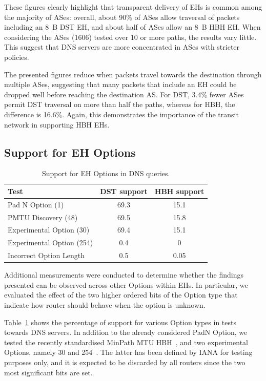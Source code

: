 \documentclass[conference]{IEEEtran}
\begin{document}
These figures clearly highlight that transparent delivery of EHs is common
among the majority of ASes: overall, about 90\% of ASes allow
traversal of packets including an 8~B DST EH, and about half of ASes allow an
8~B HBH EH.  When considering the ASes (1606) tested over 10 or more paths, the
results vary little.  This suggest that DNS servers are more concentrated in
ASes with stricter policies.

The presented figures reduce when packets travel towards the destination
through multiple ASes, suggesting that many packets that include an EH could be
dropped well before reaching the destination AS. For DST, 3.4\% fewer ASes
permit DST traversal on more than half the paths, whereas for HBH, the
difference is 16.6\%. Again, this demonstrates the importance of the transit 
network in supporting HBH EHs. 

\subsection{Support for EH Options}

\begin{table}[t]
\centering 
\caption{Support for EH Options in DNS queries.}
\begin{tabular}{l|c|c}
Test                      & DST support & HBH support\\
\hline \hline
Pad N Option (1)          & 69.3        & 15.1       \\
PMTU Discovery (48)       & 69.5        & 15.8       \\
Experimental Option (30)  & 69.4        & 15.1       \\
Experimental Option (254) & 0.4         & 0          \\
Incorrect Option Length   & 0.5         & 0.05            
\end{tabular}
\label{tbl:option_type_support}
\end{table}

Additional measurements were conducted to determine whether the findings
presented can be observed across other Options within EHs.  In particular, we
evaluated the effect of the two higher ordered bits of the Option type
that indicate how router should behave when the option is unknown.

Table~\ref{tbl:option_type_support} shows the percentage of support for various
Option types in tests towards DNS servers.  In addition to the already
considered PadN Option, we tested the recently standardised MinPath MTU
HBH~\cite{rfc9268}, and two experimental Options, namely 30 and
254~\cite{RFC4727}.  The latter has been defined by IANA for testing purposes
only, and it is expected to be discarded by all routers since the two most
significant bits are set.  
\end{document}
